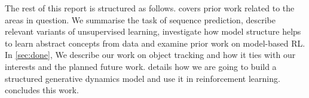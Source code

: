     The rest of this report is structured as follows.
     covers prior work related to the areas in question.
    We summarise the task of sequence prediction, describe relevant variants of unsupervised learning, investigate how model structure helps to learn abstract concepts from data and examine prior work on model-based RL.
    In \cref{sec:done}, We describe our work on object tracking and how it ties with our interests and the planned future work.
     details how we are going to build a structured generative dynamics model and use it in reinforcement learning.
     concludes this work.












